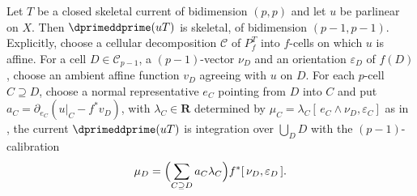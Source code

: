 \begin{theorem}
\label{thm:ch16-skeletal-product}
Let $T$ be a closed skeletal current of bidimension $(p,p)$ and let $u$ be
parlinear on $X$.  Then $\dprimeddprime(uT)$ is skeletal, of bidimension
$(p-1,p-1)$.  Explicitly, choose a cellular decomposition $\mathscr C$ of
$P^T_f$ into $f$-cells on which $u$ is affine.  For a cell
$D\in\mathscr C_{p-1}$, a $(p-1)$-vector $\nu_D$ and an orientation
$\varepsilon_D$ of $f(D)$, choose an ambient affine function $v_D$
agreeing with $u$ on $D$.  For each $p$-cell $C\supseteq D$, choose a
normal representative $e_C$ pointing from $D$ into $C$ and put
$a_C=\partial_{e_C}(u|_C-f^*v_D)$, with $\lambda_C\in\mathbf R$ determined by
$\mu_C=\lambda_C[\,e_C\wedge\nu_D,\varepsilon_C]$ as in
, the current $\dprimeddprime(uT)$ is
integration over $\bigcup_{D}D$ with the $(p-1)$-calibration
\begin{equation}
\label{eq:ch16-skeletal-weights}
 \mu_D=\Bigl(\sum_{C\supseteq D}a_C\lambda_C\Bigr)
        f^*[\,\nu_D,\varepsilon_D\,].
\end{equation}
\end{theorem}

